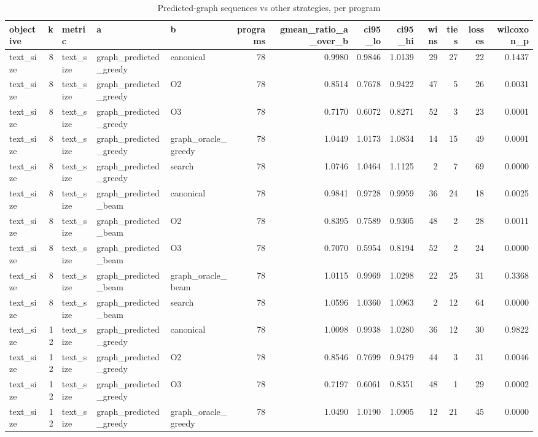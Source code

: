 \begin{table}[t]
\centering
\caption{Predicted-graph sequences vs other strategies, per program}
\label{tab:rq3-win-tie-loss}
\begin{tabular}{lrlllrrrrrrrr}
\toprule
objective & k & metric & a & b & programs & gmean\_ratio\_a\_over\_b & ci95\_lo & ci95\_hi & wins & ties & losses & wilcoxon\_p \\
\midrule
text\_size & 8 & text\_size & graph\_predicted\_greedy & canonical & 78 & 0.9980 & 0.9846 & 1.0139 & 29 & 27 & 22 & 0.1437 \\
text\_size & 8 & text\_size & graph\_predicted\_greedy & O2 & 78 & 0.8514 & 0.7678 & 0.9422 & 47 & 5 & 26 & 0.0031 \\
text\_size & 8 & text\_size & graph\_predicted\_greedy & O3 & 78 & 0.7170 & 0.6072 & 0.8271 & 52 & 3 & 23 & 0.0001 \\
text\_size & 8 & text\_size & graph\_predicted\_greedy & graph\_oracle\_greedy & 78 & 1.0449 & 1.0173 & 1.0834 & 14 & 15 & 49 & 0.0001 \\
text\_size & 8 & text\_size & graph\_predicted\_greedy & search & 78 & 1.0746 & 1.0464 & 1.1125 & 2 & 7 & 69 & 0.0000 \\
text\_size & 8 & text\_size & graph\_predicted\_beam & canonical & 78 & 0.9841 & 0.9728 & 0.9959 & 36 & 24 & 18 & 0.0025 \\
text\_size & 8 & text\_size & graph\_predicted\_beam & O2 & 78 & 0.8395 & 0.7589 & 0.9305 & 48 & 2 & 28 & 0.0011 \\
text\_size & 8 & text\_size & graph\_predicted\_beam & O3 & 78 & 0.7070 & 0.5954 & 0.8194 & 52 & 2 & 24 & 0.0000 \\
text\_size & 8 & text\_size & graph\_predicted\_beam & graph\_oracle\_beam & 78 & 1.0115 & 0.9969 & 1.0298 & 22 & 25 & 31 & 0.3368 \\
text\_size & 8 & text\_size & graph\_predicted\_beam & search & 78 & 1.0596 & 1.0360 & 1.0963 & 2 & 12 & 64 & 0.0000 \\
text\_size & 12 & text\_size & graph\_predicted\_greedy & canonical & 78 & 1.0098 & 0.9938 & 1.0280 & 36 & 12 & 30 & 0.9822 \\
text\_size & 12 & text\_size & graph\_predicted\_greedy & O2 & 78 & 0.8546 & 0.7699 & 0.9479 & 44 & 3 & 31 & 0.0046 \\
text\_size & 12 & text\_size & graph\_predicted\_greedy & O3 & 78 & 0.7197 & 0.6061 & 0.8351 & 48 & 1 & 29 & 0.0002 \\
text\_size & 12 & text\_size & graph\_predicted\_greedy & graph\_oracle\_greedy & 78 & 1.0490 & 1.0190 & 1.0905 & 12 & 21 & 45 & 0.0000 \\

\end{tabular}
\end{table}
